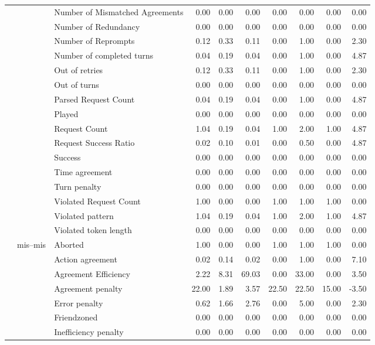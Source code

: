 \begin{tabular}{lllrrrrrrr}
 &  & Number of Mismatched Agreements & 0.00 & 0.00 & 0.00 & 0.00 & 0.00 & 0.00 & 0.00 \\
 &  & Number of Redundancy & 0.00 & 0.00 & 0.00 & 0.00 & 0.00 & 0.00 & 0.00 \\
 &  & Number of Reprompts & 0.12 & 0.33 & 0.11 & 0.00 & 1.00 & 0.00 & 2.30 \\
 &  & Number of completed turns & 0.04 & 0.19 & 0.04 & 0.00 & 1.00 & 0.00 & 4.87 \\
 &  & Out of retries & 0.12 & 0.33 & 0.11 & 0.00 & 1.00 & 0.00 & 2.30 \\
 &  & Out of turns & 0.00 & 0.00 & 0.00 & 0.00 & 0.00 & 0.00 & 0.00 \\
 &  & Parsed Request Count & 0.04 & 0.19 & 0.04 & 0.00 & 1.00 & 0.00 & 4.87 \\
 &  & Played & 0.00 & 0.00 & 0.00 & 0.00 & 0.00 & 0.00 & 0.00 \\
 &  & Request Count & 1.04 & 0.19 & 0.04 & 1.00 & 2.00 & 1.00 & 4.87 \\
 &  & Request Success Ratio & 0.02 & 0.10 & 0.01 & 0.00 & 0.50 & 0.00 & 4.87 \\
 &  & Success & 0.00 & 0.00 & 0.00 & 0.00 & 0.00 & 0.00 & 0.00 \\
 &  & Time agreement & 0.00 & 0.00 & 0.00 & 0.00 & 0.00 & 0.00 & 0.00 \\
 &  & Turn penalty & 0.00 & 0.00 & 0.00 & 0.00 & 0.00 & 0.00 & 0.00 \\
 &  & Violated Request Count & 1.00 & 0.00 & 0.00 & 1.00 & 1.00 & 1.00 & 0.00 \\
 &  & Violated pattern & 1.04 & 0.19 & 0.04 & 1.00 & 2.00 & 1.00 & 4.87 \\
 &  & Violated token length & 0.00 & 0.00 & 0.00 & 0.00 & 0.00 & 0.00 & 0.00 \\
\cline{2-10}
 & \multirow[t]{27}{*}{mis--mis} & Aborted & 1.00 & 0.00 & 0.00 & 1.00 & 1.00 & 1.00 & 0.00 \\
 &  & Action agreement & 0.02 & 0.14 & 0.02 & 0.00 & 1.00 & 0.00 & 7.10 \\
 &  & Agreement Efficiency & 2.22 & 8.31 & 69.03 & 0.00 & 33.00 & 0.00 & 3.50 \\
 &  & Agreement penalty & 22.00 & 1.89 & 3.57 & 22.50 & 22.50 & 15.00 & -3.50 \\
 &  & Error penalty & 0.62 & 1.66 & 2.76 & 0.00 & 5.00 & 0.00 & 2.30 \\
 &  & Friendzoned & 0.00 & 0.00 & 0.00 & 0.00 & 0.00 & 0.00 & 0.00 \\
 &  & Inefficiency penalty & 0.00 & 0.00 & 0.00 & 0.00 & 0.00 & 0.00 & 0.00 \\

\end{tabular}
